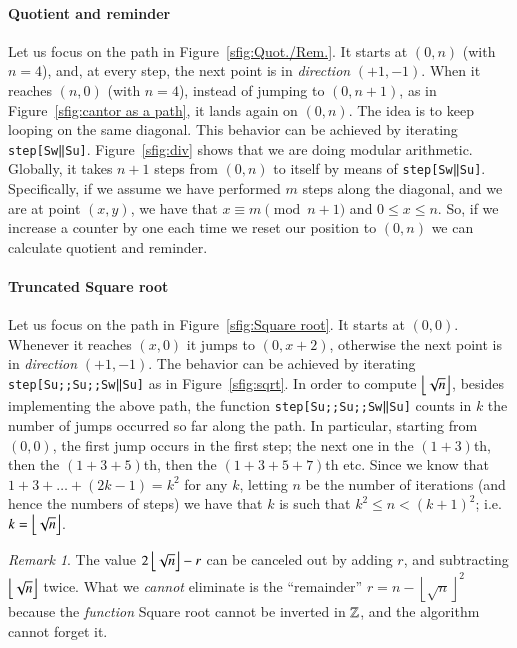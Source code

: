 \documentclass[preprint]{elsarticle}
\theoremstyle{remark}
\newtheorem{remark}{Remark}
\begin{document}
\paragraph{Quotient and reminder}
Let us focus on the path in Figure~\ref{sfig:Quot./Rem.}.
It starts at $(0,n)$ (with $ n = 4 $), and, at every step, the next point is in \emph{direction} $(+1,-1)$. When it reaches $(n,0)$ (with $ n = 4 $), instead of jumping to $(0,n+1)$, as in Figure~\ref{sfig:cantor as a path}, it lands again on $(0,n)$. The idea is to keep looping on the same diagonal. This behavior can be achieved by iterating \lstinline|step[Sw‖Su]|. Figure~\ref{sfig:div} shows that we are doing modular arithmetic.
Globally, it takes $n+1$ steps from $ (0,n) $ to itself by means of \lstinline|step[Sw‖Su]|.
Specifically, if we assume we have performed $m$ steps along the diagonal, and we are at point $ (x,y) $, we have that $x \equiv m \pmod{n+1}$ and $0 \le x \le n$.
So, if we increase a counter by one each time we reset our position to $(0,n)$ we can calculate quotient and reminder.

\paragraph{Truncated Square root}
Let us focus on the path in Figure~\ref{sfig:Square root}.
It starts at $(0,0)$. Whenever it reaches $(x,0)$ it jumps to $(0,x+2)$, otherwise the next point is in \emph{direction} $(+1,-1)$.
The behavior can be achieved by iterating \lstinline|step[Su;;Su;;Sw‖Su]| as in Figure~\ref{sfig:sqrt}.
In order to compute $ \left\lfloor \sqrt{n} \right\rfloor $, besides implementing the above path, the function \lstinline|step[Su;;Su;;Sw‖Su]| counts in $ k $ the number of jumps occurred so far along the path. In particular, starting from $ (0,0) $, the first jump occurs in the first step; the next one in the $(1+3)$th, then the $(1+3+5)$th, then the $(1+3+5+7)$th etc. Since we know that $1 + 3 + \dots + (2k - 1) = k^2$ for any $k$, letting $n$ be the number of iterations (and hence the numbers of steps) we have that $k$ is such that $k^2 \le n < (k+1)^2$; i.e. $k = \left\lfloor \sqrt{n} \right\rfloor$.

\begin{remark}
The value $2 \left\lfloor \sqrt{n} \right\rfloor - r$ can be canceled out by adding $r$, and subtracting $\left\lfloor \sqrt{n} \right\rfloor$ twice.
What we \emph{cannot} eliminate is the ``remainder'' $r = n - \left\lfloor \sqrt{n} \right\rfloor^2$ because the \emph{function} Square root
cannot be inverted in $ \mathbb{Z} $, and the algorithm cannot forget it.
\end{remark}
\end{document}
